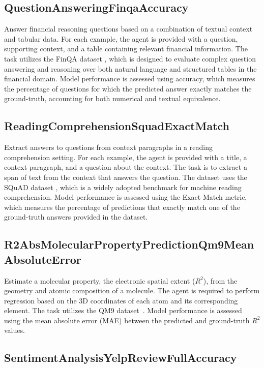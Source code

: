 \documentclass{fairmeta}
\begin{document}
\subsection{QuestionAnsweringFinqaAccuracy}

Answer financial reasoning questions based on a combination of textual context and tabular data. For each example, the agent is provided with a question, supporting context, and a table containing relevant financial information. The task utilizes the FinQA dataset \citep{chen2021finqa}, which is designed to evaluate complex question answering and reasoning over both natural language and structured tables in the financial domain. Model performance is assessed using accuracy, which measures the percentage of questions for which the predicted answer exactly matches the ground-truth, accounting for both numerical and textual equivalence.

\subsection{ReadingComprehensionSquadExactMatch}

Extract answers to questions from context paragraphs in a reading comprehension setting. For each example, the agent is provided with a title, a context paragraph, and a question about the context. The task is to extract a span of text from the context that answers the question. The dataset uses the SQuAD dataset \citep{rajpurkar2016squad}, which is a widely adopted benchmark for machine reading comprehension. Model performance is assessed using the Exact Match metric, which measures the percentage of predictions that exactly match one of the ground-truth answers provided in the dataset.

\subsection{R2AbsMolecularPropertyPredictionQm9MeanAbsoluteError}

Estimate a molecular property, the electronic spatial extent ($R^2$), from the geometry and atomic composition of a molecule. The agent is required to perform regression based on the 3D coordinates of each atom and its corresponding element. The task utilizes the QM9 dataset~\citep{ramakrishnan2014quantum}. Model performance is assessed using the mean absolute error (MAE) between the predicted and ground-truth $R^2$ values.


\subsection{SentimentAnalysisYelpReviewFullAccuracy}
\end{document}
